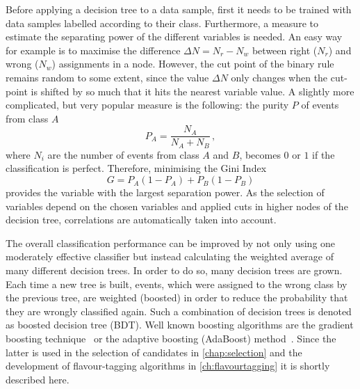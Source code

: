 Before applying a decision tree to a data sample, first it needs to be trained with data samples labelled according to their class.
Furthermore, a measure to estimate the separating power of the different variables is needed.
An easy way for example is to maximise the difference $\Delta N=N_r-N_w$ between right ($N_r$) and wrong ($N_w$) assignments in a node.
However, the cut point of the binary rule remains random to some extent, since the value $\Delta N$ only changes when the cut-point is shifted by so much that it hits the nearest variable value.
A slightly more complicated, but very popular measure is the following:
the purity $P$ of events from class $A$
\begin{equation}
P_A=\frac{N_A}{N_A+N_B}\,,
\end{equation}
where $N_i$ are the number of events from class $A$ and $B$, becomes $0$ or $1$ if the classification is perfect.
Therefore, minimising the Gini Index~\cite{Bohm:389738}
\begin{equation}
G=P_A\left(1-P_A\right)+P_B\left(1-P_B\right)
\end{equation}
provides the variable with the largest separation power.
As the selection of variables depend on the chosen variables and applied cuts in higher nodes of the decision tree, correlations are automatically taken into account.

The overall classification performance can be improved by not only using one moderately effective classifier but instead calculating the weighted average of many different decision trees.
In order to do so, many decision trees are grown.
Each time a new tree is built, events, which were assigned to the wrong class by the previous tree, are weighted (boosted) in order to reduce the probability that they are wrongly classified again.
Such a combination of decision trees is denoted as boosted decision tree (\ac{BDT}).
Well known boosting algorithms are the gradient boosting technique~\cite{gradientBoost} or the adaptive boosting (AdaBoost) method~\cite{AdaBoost}.
Since the latter is used in the selection of \BdToDpi candidates in \cref{chap:selection} and the development of flavour-tagging algorithms in \cref{ch:flavourtagging} it is shortly described here.


